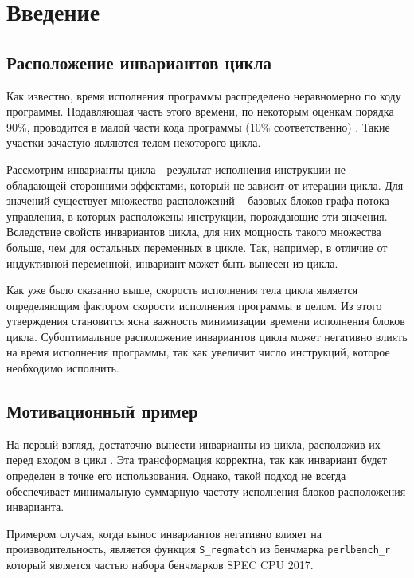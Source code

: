 \chapter*{Введение}

\section*{Расположение инвариантов цикла}

Как известно, время исполнения программы распределено неравномерно по коду программы.
Подавляющая часть этого времени, по некоторым оценкам порядка 90\%, проводится в малой части кода программы (10\% соответственно) \cite{Aho_Ullman_focs}.
Такие участки зачастую являются телом некоторого цикла.

Рассмотрим инварианты цикла - результат исполнения инструкции не обладающей сторонними эффектами, который не зависит от итерации цикла.
Для значений существует множество расположений -- базовых блоков графа потока управления, в которых расположены инструкции, порождающие эти значения.
Вследствие свойств инвариантов цикла, для них мощность такого множества больше, чем для остальных переменных в цикле.
Так, например, в отличие от индуктивной переменной, инвариант может быть вынесен из цикла.

Как уже было сказанно выше, скорость исполнения тела цикла является определяющим фактором скорости исполнения программы в целом.
Из этого утверждения становится ясна важность минимизации времени исполнения блоков цикла.
Субоптимальное расположение инвариантов цикла может негативно влиять на время исполнения программы, так как увеличит число инструкций, которое необходимо исполнить.

\section*{Мотивационный пример}

На первый взгляд, достаточно вынести инварианты из цикла, расположив их перед входом в цикл \cite{Aho_Sethi_Ullman_9_1_7}.
Эта трансформация корректна, так как инвариант будет определен в точке его использования.
Однако, такой подход не всегда обеспечивает минимальную суммарную частоту исполнения блоков расположения инварианта.

Примером случая, когда вынос инвариантов негативно влияет на производительность, является функция \texttt{S\_regmatch} из бенчмарка \texttt{perlbench\_r} который является частью набора бенчмарков SPEC CPU\textsuperscript{\tiny\textregistered} 2017.

